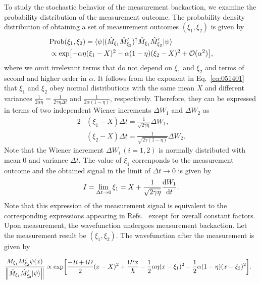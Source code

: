 \documentclass[aps,pra,superscriptaddress,twocolumn
]{revtex4-2}
\renewcommand{\i}{\mathrm{i}}
\renewcommand{\d}{{\rm d}}
\begin{document}
 
 To study the stochastic behavior of the measurement backaction, 
 we examine the probability distribution of the measurement outcome.
 The probability density distribution of obtaining a set of measurement outcomes $(\xi_1,\xi_2)$ 
 is given by
 \begin{alignat}{1}
  &\mathrm{Prob} (\xi_1,\xi_2)
  = \langle \psi| (\hat M_{\xi_1} \hat M'_{\xi_2})^\dagger \hat M_{\xi_1} \hat M'_{\xi_2} |\psi\rangle \notag \\
   &\propto \exp[ - \alpha \eta (\xi_1 - X)^2 - \alpha (1-\eta)(\xi_2 - X)^2 + \mathcal{O}(\alpha^2)], \label{eq:051401}
 \end{alignat}
 where we omit irrelevant terms that do not depend on $\xi_1$ and $\xi_2$ 
 and terms of second and higher order in $\alpha$.
 It follows from the exponent in Eq.~\eqref{eq:051401} 
 that $\xi_1$ and $\xi_2$ obey 
 normal distributions with the same mean $X$ and 
 different variances $\frac{1}{2\alpha \eta} = \frac{1}{2\gamma\eta \Delta t}$ 
 and $\frac{1}{2\alpha(1-\eta)}$, respectively.
 Therefore, they can be expressed in terms of two independent Wiener increments $\Delta W_1$ and $\Delta W_2$ as 
 \begin{alignat}{2}
  &(\xi_1 - X) \Delta t = \frac{1}{\sqrt{2\gamma \eta}}\Delta W_1,\\
  &(\xi_2 - X) \Delta t = \frac{1}{\sqrt{2\gamma (1-\eta)}}\Delta W_2. 
 \end{alignat}
 Note that the Wiener increment $\Delta W_{i}\, (i=1,2)$ is normally distributed with mean 0 and variance $\Delta t$.
 The value of $\xi_1$ correnponds to the measurement outcome and
 the obtained signal in the limit of $\Delta t \to 0$ is given by
 \begin{equation}
  I = \lim_{\Delta t \to 0} \xi_1 = X + \frac{1}{\sqrt{2\gamma\eta}}\frac{\d W_1}{\d t}.
  \label{eq:measurement-outcome}
 \end{equation}
 Note that this expression of the measurement signal is equivalent to the corresponding expressions 
 appearing 
 in Refs.~\cite{Di_si_1988,PhysRevA.60.2700,PhysRevLett.70.548}
 except for overall constant factors.
 Upon measurement, the wavefunction undergoes measurement backaction.
 Let the measurement result be $(\xi_1, \xi_2)$.
 The wavefunction after the measurement is given by
 \begin{widetext}
   \begin{alignat}{1}
  \frac{M_{\xi_1} M'_{\xi_2} \psi(x) }{\norm{\hat M_{\xi_1} \hat M'_{\xi_2} |\psi\rangle}}
   &\propto \exp[
  \frac{-R+\i D}{2}(x-X)^2 + \frac{\i P x}{\hbar}
  -\frac{1}{2}\alpha\eta(x-\xi_1)^2 - \frac{1}{2}\alpha(1-\eta)(x-\xi_2)^2].
 \end{alignat}
 \end{widetext}
\end{document}
